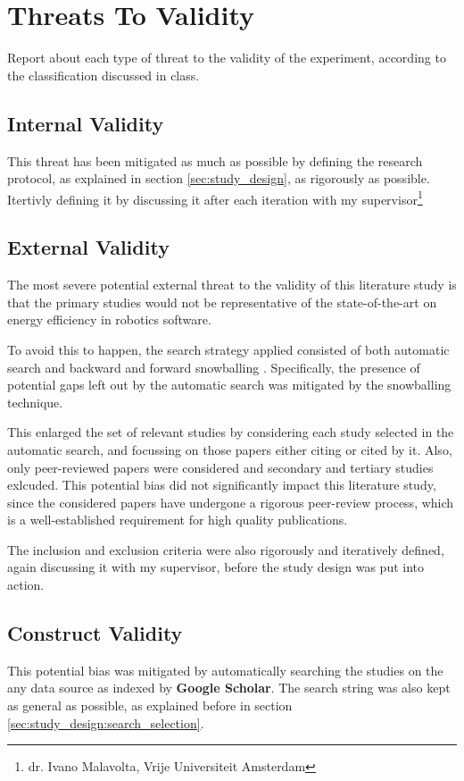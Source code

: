 \section{Threats To Validity}\label{sec:threats}
Report about each type of threat to the validity of the experiment, according to the classification discussed in class.

\subsection{Internal Validity}
This threat has been mitigated as much as possible by defining the research protocol, as explained in section \ref{sec:study_design}, 
as rigorously as possible.
Itertivly defining it by discussing it after each iteration with my supervisor\footnote{dr. Ivano Malavolta, Vrije Universiteit Amsterdam}

\subsection{External Validity}
The most severe potential external threat to the validity of this literature study is that the primary studies would not 
be representative of the state-of-the-art on energy efficiency in robotics software.

To avoid this to happen, the search strategy applied consisted of both automatic search and backward and forward snowballing 
\cite{wohlin2014snowballing}. Specifically, the presence of potential gaps left out by the automatic search was mitigated by 
the snowballing technique. 

This enlarged the set of relevant studies by considering each study selected in the automatic search, 
and focussing on those papers either citing or cited by it. 
Also, only peer-reviewed papers were considered and secondary and tertiary studies exlcuded.
This potential bias did not significantly impact this literature study, since the considered papers have undergone a rigorous
peer-review process, which is a well-established requirement for high quality publications. 

The inclusion and exclusion criteria were also rigorously and iteratively defined, again discussing it with my supervisor,
before the study design was put into action.

\subsection{Construct Validity}
This potential bias was mitigated by automatically searching the studies on the any data source as indexed by \textbf{Google Scholar}.
The search string was also kept as general as possible, as explained before in section \ref{sec:study_design:search_selection}.

